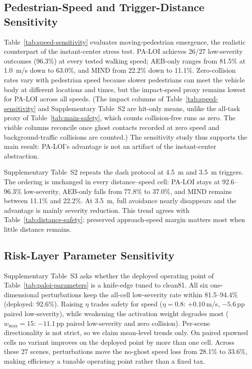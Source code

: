 \documentclass[journal]{IEEEtran}
\begin{document}
\subsection{Pedestrian-Speed and Trigger-Distance Sensitivity}
\label{subsec:speed-sensitivity}



Table~\ref{tab:speed-sensitivity} evaluates moving-pedestrian emergence, the realistic counterpart of the instant-center stress test. PA-LOI achieves 26/27 low-severity outcomes (96.3\%) at every tested walking speed; AEB-only ranges from 81.5\% at \SI{1.0}{m/s} down to 63.0\%, and MIND from 22.2\% down to 11.1\%. Zero-collision rates vary with pedestrian speed because slower pedestrians can meet the vehicle body at different locations and times, but the impact-speed proxy remains lowest for PA-LOI across all speeds. (The impact columns of Table~\ref{tab:speed-sensitivity} and Supplementary Table~S2 are hit-only means, unlike the all-task proxy of Table~\ref{tab:main-safety}, which counts collision-free runs as zero. The visible columns reconcile once ghost contacts recorded at zero speed and background-traffic collisions are counted.) The sensitivity study thus supports the main result: PA-LOI's advantage is not an artifact of the instant-center abstraction.

Supplementary Table~S2 repeats the dash protocol at \SI{4.5}{m} and \SI{3.5}{m} triggers. The ordering is unchanged in every distance--speed cell: PA-LOI stays at 92.6--96.3\% low-severity, AEB-only falls from 77.8\% to 37.0\%, and MIND remains between 11.1\% and 22.2\%. At \SI{3.5}{m}, full avoidance nearly disappears and the advantage is mainly severity reduction. This trend agrees with Table~\ref{tab:distance-safety}: preserved approach-speed margin matters most when little distance remains.

\subsection{Risk-Layer Parameter Sensitivity}
\label{subsec:param-sensitivity}

Supplementary Table~S3 asks whether the deployed operating point of Table~\ref{tab:paloi-parameters} is a knife-edge tuned to clean81. All six one-dimensional perturbations keep the all-cell low-severity rate within 81.5--94.4\% (deployed: 92.6\%). Raising $\eta$ trades safety for speed ($\eta{=}0.8$: $+0.10$\,m/s, $-5.6$\,pp paired low-severity), while weakening the activation weight degrades most ($w_{\max}{=}15$: $-11.1$\,pp paired low-severity and zero collision). Per-scene directionality is not strict, so we claim mean-level trends only. On paired spawned cells no variant improves on the deployed point by more than one cell. Across these 27 scenes, perturbations move the no-ghost speed loss from 28.1\% to 33.6\%, making efficiency a tunable operating point rather than a fixed tax.
\end{document}
